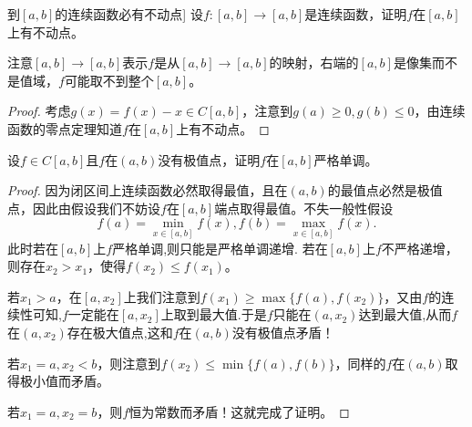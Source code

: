 \documentclass[../../main.tex]{subfiles}%
\begin{document}
\begin{proposition}[\([a,b]\)到\([a,b]\)的连续函数必有不动点]\label{proposition:[a,b]到[a,b]的连续函数必有不动点}
设\(f:[a,b]\to[a,b]\)是连续函数，证明\(f\)在\([a,b]\)上有不动点。
\end{proposition}
\begin{note}
注意\([a,b]\to[a,b]\)表示\(f\)是从\([a,b]\to[a,b]\)的映射，右端的\([a,b]\)是像集而不是值域，\(f\)可能取不到整个\([a,b]\)。
\end{note}
\begin{proof}
考虑\(g(x)=f(x)-x\in C[a,b]\)，注意到\(g(a)\geqslant0,g(b)\leqslant0\)，由连续函数的零点定理知道\(f\)在\([a,b]\)上有不动点。
\end{proof}

\begin{proposition}[没有极值点则严格单调]\label{proposition:没有极值点则严格单调}
设\(f\in C[a,b]\)且\(f\)在\((a,b)\)没有极值点，证明\(f\)在\([a,b]\)严格单调。
\end{proposition}
\begin{proof}
因为闭区间上连续函数必然取得最值，且在\((a,b)\)的最值点必然是极值点，因此由假设我们不妨设\(f\)在\([a,b]\)端点取得最值。不失一般性假设
\[
f(a)=\min_{x\in[a,b]}f(x),f(b)=\max_{x\in[a,b]}f(x).
\]
此时若在\([a,b]\)上\(f\)严格单调,则只能是严格单调递增.
若在\([a,b]\)上\(f\)不严格递增，则存在\(x_2>x_1\)，使得\(f(x_2)\leqslant f(x_1)\)。

若\(x_1>a\)，在\([a,x_2]\)上我们注意到\(f(x_1)\geqslant\max\{f(a),f(x_2)\}\)，又由$f$的连续性可知,$f$一定能在$[a,x_2]$上取到最大值.于是\(f\)只能在\((a,x_2)\)达到最大值,从而$f$在\((a,x_2)\)存在极大值点,这和\(f\)在\((a,b)\)没有极值点矛盾！

若\(x_1 = a,x_2 < b\)，则注意到\(f(x_2)\leqslant\min\{f(a),f(b)\}\)，同样的\(f\)在\((a,b)\)取得极小值而矛盾。

若\(x_1 = a,x_2 = b\)，则\(f\)恒为常数而矛盾！这就完成了证明。
\end{proof}
\end{document}
